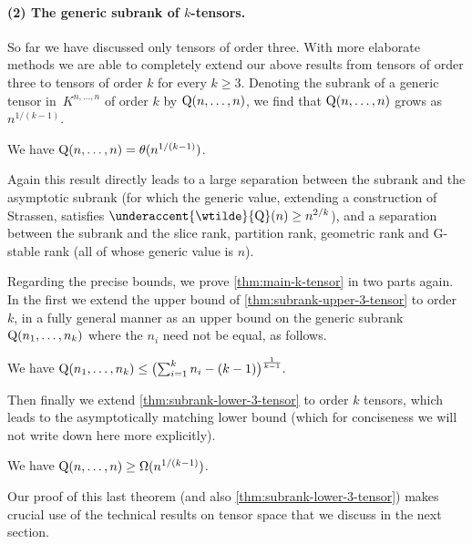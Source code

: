 \documentclass[11pt]{article}
\theoremstyle{definition}
\theoremstyle{remark}
\newcommand{\gensubrank}{{\rm Q}}
\DeclareMathOperator{\asympsubrank}{\underaccent{\wtilde}{Q}}
\begin{document}
%

%

%
%
%
%
%
%
%
%
%
%

\paragraph{(2) The generic subrank of $k$-tensors.}
So far we have discussed only tensors of order three. With more elaborate methods we are able to completely extend our above results from tensors of order three to tensors of order $k$ for every $k \geq 3$. Denoting the subrank of a generic tensor in~$K^{n,\ldots, n}$ of order $k$ by $\gensubrank(n,\ldots,n)$, we find that $\gensubrank(n,\ldots,n)$ grows as~$n^{1/(k-1)}$.

\begin{theorem}\label{thm:main-k-tensor}
We have $\gensubrank(n,\ldots,n) = \theta(n^{1/(k-1)})$.
\end{theorem}

Again this result directly leads to a large separation between the subrank and the asymptotic subrank (for which the generic value, extending a construction of Strassen, satisfies $\asympsubrank(n) \geq n^{2/k}$), and a separation between the subrank and the slice rank, partition rank, geometric rank and G-stable rank (all of whose generic value is $n$).

Regarding the precise bounds, we prove \autoref{thm:main-k-tensor} in two parts again. 
In the first we extend the upper bound of \autoref{thm:subrank-upper-3-tensor}
to order $k$, in a fully general manner as an upper bound on the generic subrank $\gensubrank(n_1,\ldots,n_k)$ where the $n_i$ need not be equal, as follows.

\begin{theorem} \label{thm:subrank-upper-k-tensor}
%
We have
$
\gensubrank(n_1,\ldots,n_k) \leq \bigl(\sum_{i=1}^k n_i - (k-1)\bigr)^{\frac{1}{k-1}}.
$
\end{theorem}

Then finally we extend \autoref{thm:subrank-lower-3-tensor} to order $k$ tensors, which leads to the asymptotically matching lower bound (which for conciseness we will not write down here more explicitly).

\begin{theorem}\label{thm:subrank-lower-k-tensor}
We have $\gensubrank(n,\ldots,n) \geq \Omega(n^{1/(k-1)})$.
\end{theorem}

Our proof of this last theorem (and also \autoref{thm:subrank-lower-3-tensor}) makes crucial use of the  technical results on tensor space that we discuss in the next section.
\end{document}
